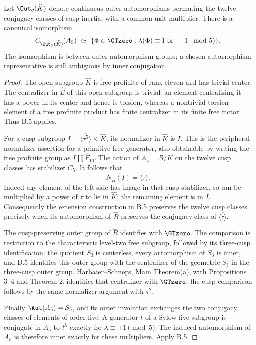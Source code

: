 Let \(\Out_{\partial}(\widehat K)\) denote continuous outer
automorphisms permuting the twelve conjugacy classes of cusp inertia,
with a common unit multiplier. There is a canonical isomorphism
\[
 C_{\Out_{\partial}(\widehat K)}(A_5)
 \ \simeq\
 \{\Phi\in\GTzero:\lambda(\Phi)\equiv1\text{ or }-1\pmod5\}.
\]
The isomorphism is between outer automorphism groups; a chosen
automorphism representative is still ambiguous by inner conjugation.
\begin{proof}
The open subgroup \(\widehat K\) is free profinite of rank eleven and
has trivial center. The centralizer in \(\widehat B\) of this open
subgroup is trivial: an element centralizing it has a power in its
center and hence is torsion, whereas a nontrivial torsion element
of a free profinite product has finite centralizer in its finite
free factor. Thus B.5 applies.

For a cusp subgroup \(I=\overline{\langle\tau^5\rangle}\leq\widehat K\),
its normalizer in \(\widehat K\) is \(I\). This is the
peripheral normalizer assertion for a primitive free generator,
also obtainable by writing the free profinite group as
\(I\amalg\widehat F_{10}\). The action of
\(A_5=B/K\) on the twelve cusp classes has stabilizer \(C_5\).
It follows that
\[
 N_{\widehat B}(I)=\overline{\langle\tau\rangle}.
\]
Indeed any element of the left side has image in that cusp
stabilizer, so can be multiplied by a power of \(\tau\) to lie
in \(\widehat K\); the remaining element is in \(I\).
Consequently the extension construction in B.5 preserves the
twelve cusp classes precisely when its automorphism of
\(\widehat B\) preserves the conjugacy class of
\(\overline{\langle\tau\rangle}\).

The cusp-preserving outer group of \(\widehat B\) identifies with
\(\GTzero\). The comparison is restriction to the characteristic
level-two free subgroup, followed by its three-cusp identification:
the quotient \(S_3\) is centerless, every automorphism of \(S_3\) is
inner, and B.5 identifies this outer group with the centralizer of
the geometric \(S_3\) in the three-cusp outer group.
Harbater--Schneps, Main Theorem(a), with Propositions 3--4 and
Theorem 2, identifies that centralizer with \(\GTzero\);
the cusp comparison follows by the same normalizer argument with
\(\tau^2\).

Finally \(\Aut(A_5)=S_5\), and its outer involution exchanges the
two conjugacy classes of elements of order five. A generator \(t\)
of a Sylow five subgroup is conjugate in \(A_5\) to \(t^\lambda\)
exactly for \(\lambda\equiv\pm1\pmod5\).
The induced automorphism of \(A_5\) is therefore inner exactly for
these multipliers. Apply B.5.
\end{proof}

